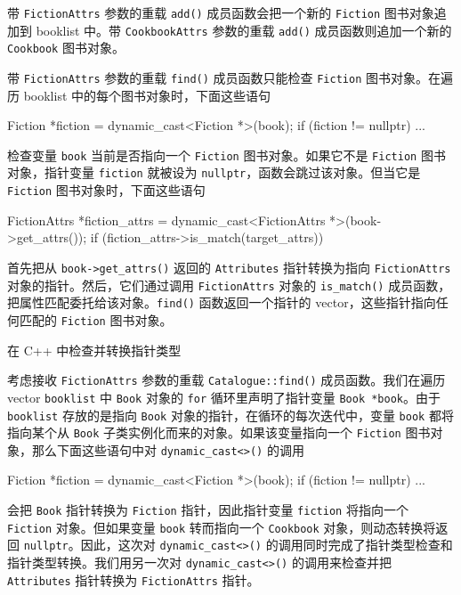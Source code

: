 带 \texttt{Fiction\allowbreak{}Attrs} 参数的重载 \texttt{add()} 成员函数会把一个新的 \texttt{Fiction} 图书对象追加到 booklist 中。带 \texttt{Cookbook\allowbreak{}Attrs} 参数的重载 \texttt{add()} 成员函数则追加一个新的 \texttt{Cookbook} 图书对象。

带 \texttt{Fiction\allowbreak{}Attrs} 参数的重载 \texttt{find()} 成员函数只能检查 \texttt{Fiction} 图书对象。在遍历 booklist 中的每个图书对象时，下面这些语句

\begin{codebox}
Fiction *fiction = dynamic_cast<Fiction *>(book);
if (fiction != nullptr) ...
\end{codebox}

检查变量 \texttt{book} 当前是否指向一个 \texttt{Fiction} 图书对象。如果它不是 \texttt{Fiction} 图书对象，指针变量 \texttt{fiction} 就被设为 \texttt{nullptr}，函数会跳过该对象。但当它是 \texttt{Fiction} 图书对象时，下面这些语句

\begin{codebox}
FictionAttrs *fiction_attrs =
                  dynamic_cast<FictionAttrs *>(book->get_attrs());
if (fiction_attrs->is_match(target_attrs))
\end{codebox}

首先把从 \texttt{book->get\_\allowbreak{}attrs(\allowbreak{})\allowbreak{}} 返回的 \texttt{Attributes} 指针转换为指向 \texttt{Fiction\allowbreak{}Attrs} 对象的指针。然后，它们通过调用 \texttt{Fiction\allowbreak{}Attrs} 对象的 \texttt{is\_\allowbreak{}match(\allowbreak{})\allowbreak{}} 成员函数，把属性匹配委托给该对象。\texttt{find()} 函数返回一个指针的 vector，这些指针指向任何匹配的 \texttt{Fiction} 图书对象。

\begin{mySidebar}{在 C++ 中检查并转换指针类型}

考虑接收 \texttt{Fiction\allowbreak{}Attrs} 参数的重载 \texttt{Catalogue::\allowbreak{}find(\allowbreak{})\allowbreak{}} 成员函数。我们在遍历 vector \texttt{booklist} 中 \texttt{Book} 对象的 \texttt{for} 循环里声明了指针变量 \texttt{Book *book}。由于 \texttt{booklist} 存放的是指向 \texttt{Book} 对象的指针，在循环的每次迭代中，变量 \texttt{book} 都将指向某个从 \texttt{Book} 子类实例化而来的对象。如果该变量指向一个 \texttt{Fiction} 图书对象，那么下面这些语句中对 \texttt{dynamic\_\allowbreak{}cast<>(\allowbreak{})\allowbreak{}} 的调用

\begin{codebox}
    Fiction *fiction = dynamic_cast<Fiction *>(book);
    if (fiction != nullptr) ...
\end{codebox}

会把 \texttt{Book} 指针转换为 \texttt{Fiction} 指针，因此指针变量 \texttt{fiction} 将指向一个 \texttt{Fiction} 对象。但如果变量 \texttt{book} 转而指向一个 \texttt{Cookbook} 对象，则动态转换将返回 \texttt{nullptr}。因此，这次对 \texttt{dynamic\_\allowbreak{}cast<>(\allowbreak{})\allowbreak{}} 的调用同时完成了指针类型检查和指针类型转换。我们用另一次对 \texttt{dynamic\_\allowbreak{}cast<>(\allowbreak{})\allowbreak{}} 的调用来检查并把 \texttt{Attributes} 指针转换为 \texttt{Fiction\allowbreak{}Attrs} 指针。
\end{mySidebar}

